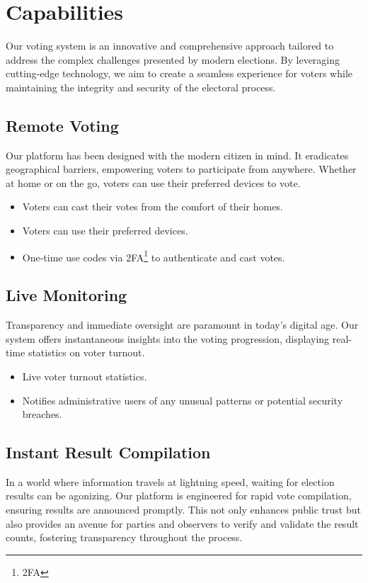 \documentclass{article}
\begin{document}
\section{Capabilities}
Our voting system is an innovative and comprehensive approach tailored to address the complex challenges presented by modern elections. By leveraging cutting-edge technology, we aim to create a seamless experience for voters while maintaining the integrity and security of the electoral process.

\subsection{Remote Voting}
Our platform has been designed with the modern citizen in mind. It eradicates geographical barriers, empowering voters to participate from anywhere. Whether at home or on the go, voters can use their preferred devices to vote.

\begin{itemize}
    \item Voters can cast their votes from the comfort of their homes.
    \item Voters can use their preferred devices.
    \item One-time use codes via \gls{2FA}\footnote{\glsdesc{2FA}} to authenticate and cast votes.
\end{itemize}

\subsection{Live Monitoring}
 Transparency and immediate oversight are paramount in today's digital age. Our system offers instantaneous insights into the voting progression, displaying real-time statistics on voter turnout.

\begin{itemize}
    \item Live voter turnout statistics.
    \item Notifies administrative users of any unusual patterns or potential security breaches.
\end{itemize}

\subsection{Instant Result Compilation}
In a world where information travels at lightning speed, waiting for election results can be agonizing. Our platform is engineered for rapid vote compilation, ensuring results are announced promptly. This not only enhances public trust but also provides an avenue for parties and observers to verify and validate the result counts, fostering transparency throughout the process.
\end{document}
